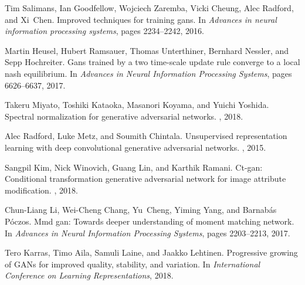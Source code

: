 \documentclass{article}
\begin{document}
\begin{thebibliography}{10}
Tim Salimans, Ian Goodfellow, Wojciech Zaremba, Vicki Cheung, Alec Radford, and
  Xi~Chen.
\newblock Improved techniques for training gans.
\newblock In {\em Advances in neural information processing systems}, pages
  2234--2242, 2016.

Martin Heusel, Hubert Ramsauer, Thomas Unterthiner, Bernhard Nessler, and Sepp
  Hochreiter.
\newblock Gans trained by a two time-scale update rule converge to a local nash
  equilibrium.
\newblock In {\em Advances in Neural Information Processing Systems}, pages
  6626--6637, 2017.

Takeru Miyato, Toshiki Kataoka, Masanori Koyama, and Yuichi Yoshida.
\newblock Spectral normalization for generative adversarial networks.
, 2018.

Alec Radford, Luke Metz, and Soumith Chintala.
\newblock Unsupervised representation learning with deep convolutional
  generative adversarial networks.
, 2015.

Sangpil Kim, Nick Winovich, Guang Lin, and Karthik Ramani.
\newblock Ct-gan: Conditional transformation generative adversarial network for
  image attribute modification.
, 2018.

Chun-Liang Li, Wei-Cheng Chang, Yu~Cheng, Yiming Yang, and Barnab{\'a}s
  P{\'o}czos.
\newblock Mmd gan: Towards deeper understanding of moment matching network.
\newblock In {\em Advances in Neural Information Processing Systems}, pages
  2203--2213, 2017.

Tero Karras, Timo Aila, Samuli Laine, and Jaakko Lehtinen.
\newblock Progressive growing of {GAN}s for improved quality, stability, and
  variation.
\newblock In {\em International Conference on Learning Representations}, 2018.

\end{thebibliography}
\end{document}
